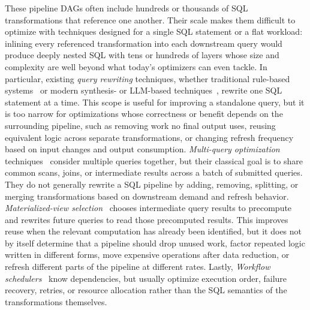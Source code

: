 These pipeline DAGs often include hundreds or thousands of SQL transformations that reference one another. Their scale makes them difficult to optimize with techniques designed for a single SQL statement or a flat workload: inlining every referenced transformation into each downstream query would produce deeply nested SQL with tens or hundreds of layers whose size and complexity are well beyond what today's optimizers can even tackle. In particular, existing \emph{query rewriting} techniques, whether traditional rule-based systems~\cite{wetune} or modern synthesis- or LLM-based techniques~\cite{slabcity,genrewrite,rbot}, rewrite one SQL statement at a time.  This scope is useful for improving a standalone query, but it is too narrow for optimizations whose correctness or benefit depends on the surrounding pipeline, such as removing work no final output uses, reusing equivalent logic across separate transformations, or changing refresh frequency based on input changes and output consumption.
 \emph{Multi-query optimization} techniques~\cite{sellis1988multiple,roy2000efficient} consider multiple queries together, but their classical goal is to share common scans, joins, or intermediate results across a batch of submitted queries. They do not generally rewrite a SQL pipeline by adding, removing, splitting, or merging transformations based on downstream demand and refresh behavior.
 \emph{Materialized-view selection}~\cite{harinarayan1996implementing,agrawal2000automated} chooses intermediate query results to precompute and rewrites future queries to read those precomputed results. This improves reuse when the relevant computation has already been identified, but it does not by itself determine that a pipeline should drop unused work, factor repeated logic written in different forms, move expensive operations after data reduction, or refresh different parts of the pipeline at different rates.
Lastly, \emph{Workflow schedulers}~\cite{airflowDags,dagsterAssets,prefectTasks,argoDag} know dependencies, but usually optimize execution order, failure recovery, retries, or resource allocation rather than the SQL semantics of the transformations themselves. 


